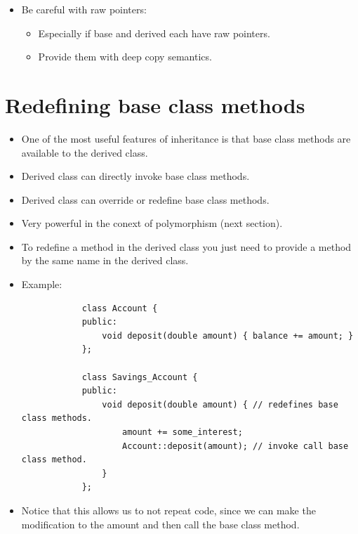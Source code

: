 \begin{itemize}
\begin{itemize}
            \item Be careful with raw pointers:
                \begin{itemize}
                    \item Especially if base and derived each have raw pointers.
                    \item Provide them with deep copy semantics.
                \end{itemize}
        \end{itemize}
\end{itemize}

\section{Redefining base class methods}
\begin{itemize}
    \item One of the most useful features of inheritance is that base class methods are available to the derived class.
    \item Derived class can directly invoke base class methods.
    \item Derived class can override or redefine base class methods.
    \item Very powerful in the conext of polymorphism (next section).
    \item To redefine a method in the derived class you just need to provide a method by the same name in the derived class.
    \item Example:
        \begin{verbatim}
            class Account {
            public:
                void deposit(double amount) { balance += amount; }
            };

            class Savings_Account {
            public:
                void deposit(double amount) { // redefines base class methods.
                    amount += some_interest;
                    Account::deposit(amount); // invoke call base class method.
                }
            };
        \end{verbatim}
    
    \item Notice that this allows us to not repeat code, since we can make the modification to the amount and then call the base class method.
\end{itemize}


